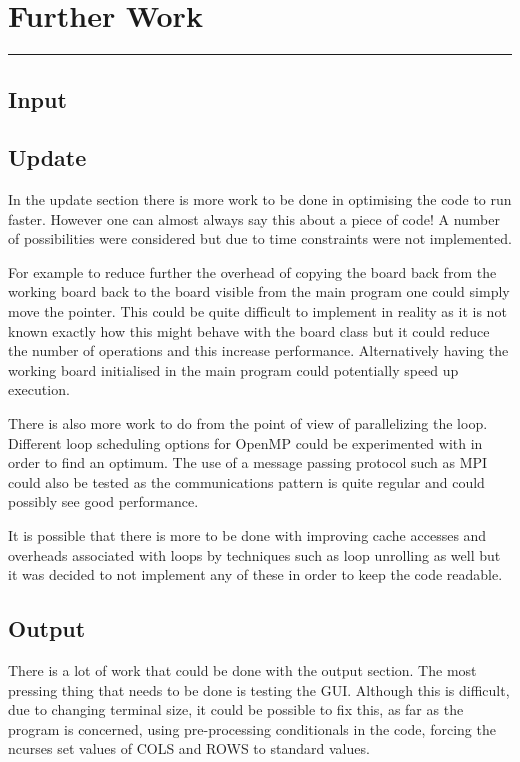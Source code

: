 \section{Further Work}
\vspace{-2em}\rule{\textwidth}{1pt}\vspace{-1em}
\subsection{Input}
\subsection{Update}
  In the update section there is more work to be done in optimising the code to run faster.
  However one can almost always say this about a piece of code!
  A number of possibilities were considered but due to time constraints were not implemented.

  For example to reduce further the overhead of copying the board back from the working board back to the board visible from the main program one could simply move the pointer.
  This could be quite difficult to implement in reality as it is not known exactly how this might behave with the board class but it could reduce the number of operations and this increase performance.
  Alternatively having the working board initialised in the main program could potentially speed up execution.

  There is also more work to do from the point of view of parallelizing the loop.
  Different loop scheduling options for OpenMP could be experimented with in order to find an optimum.
  The use of a message passing protocol such as MPI could also be tested as the communications pattern is quite regular and could possibly see good performance.

  It is possible that there is more to be done with improving cache accesses and overheads associated with loops by techniques such as loop unrolling as well but it was decided to not implement any of these in order to keep the code readable.
\subsection{Output}
	There is a lot of work that could be done with the output section.
	The most pressing thing that needs to be done is testing the GUI.
	Although this is difficult, due to changing terminal size, it could be possible to fix this, as far as the program is concerned, using
	pre-processing conditionals in the code, forcing the ncurses set values of COLS and ROWS to standard values.
	
